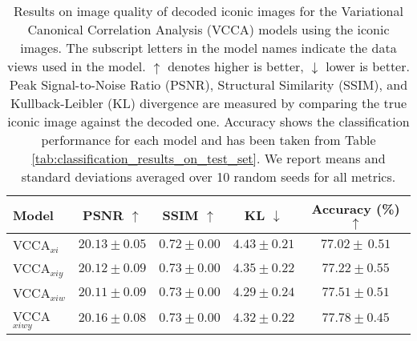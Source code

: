 
\renewcommand{\arraystretch}{1.05}
\begin{table}[!th]
\centering
\caption{Results on image quality of decoded iconic images for the Variational Canonical Correlation Analysis (VCCA) models using the iconic images. The subscript letters in the model names indicate the data views used in the model. $\uparrow$ denotes higher is better, $\downarrow$ lower is better. Peak Signal-to-Noise Ratio (PSNR), Structural Similarity (SSIM), and Kullback-Leibler (KL) divergence are measured by comparing the true iconic image against the decoded one. Accuracy shows the classification performance for each model and has been taken from Table \ref{tab:classification_results_on_test_set}. We report means and standard deviations averaged over 10 random seeds for all metrics.
}
\vspace{-2mm}
\begin{tabular}{l c c c c }
    \hline
    Model & PSNR $\uparrow$ & SSIM $\uparrow$ & KL $\downarrow$ &  Accuracy (\%) $\uparrow$  \\ \hline
    VCCA$_{x i}$ & $20.13 \pm 0.05$ & $0.72 \pm 0.00$ & $4.43 \pm 0.21$ & $77.02 \pm \, 0.51$  \\ 
    \rowcolor{gray!30}
    VCCA$_{x i y}$ & $20.12 \pm 0.09$ & $0.73 \pm 0.00$ & $4.35 \pm 0.22$ & $77.22 \pm 0.55$  \\ 
    VCCA$_{x i w}$ & $20.11 \pm 0.09$ & $0.73 \pm 0.00$ & $4.29 \pm 0.24$ & $77.51 \pm 0.51$  \\
    \rowcolor{gray!30}
    VCCA$_{x i w y}$ & $20.16 \pm 0.08$ & $0.73 \pm	0.00$ & $4.32 \pm 0.22$ & $77.78 \pm 0.45$  \\  
    \hline
\end{tabular}
\label{tab:iconic_image_similarity_metrics}
\vspace{-3mm}
\end{table}